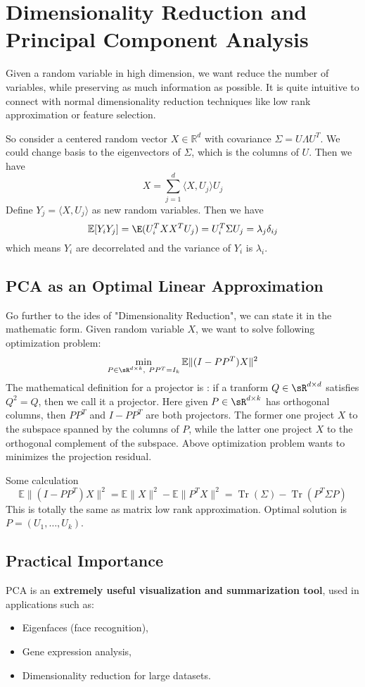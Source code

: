 \documentclass{article}
\begin{document}
\section{Dimensionality Reduction and Principal Component Analysis}
Given a random variable in high dimension, we want reduce the number of variables, while preserving as much information as possible. It is quite intuitive to connect with normal dimensionality reduction techniques like low rank approximation or feature selection.

So consider a centered random vector \( X \in \mathbb{R}^d \) with covariance \( \Sigma =U \Lambda U^T \). We could change basis to the eigenvectors of \( \Sigma \), which is the columns of \( U \). Then we have
\[
X=\sum_{j=1}^{d} \langle X, U_j \rangle U_j
\] 
Define $Y_j=\langle X, U_j \rangle$ as new random variables. Then we have
\[
\mathbb{E}[Y_i Y_j]=\E(U_i^T X X^T U_j)=U_i^T \Sigma U_j=\lambda_j \delta_{ij}
\]
which means \( Y_i \) are decorrelated and the variance of \( Y_i \) is \( \lambda_i \).



\subsection{PCA as an Optimal Linear Approximation}
Go further to the ides of "Dimensionality Reduction", we can state it in the mathematic form. Given random variable $X$, we want to solve following optimization problem:
\[
\min_{P\in \sR^{d\times k},\ PP^T=I_k } \mathbb{E} \| (I- P P^T) X \|^2
\]
The mathematical definition for a projector is : if a tranform $Q\in \sR^{d\times d}$ satisfies $Q^2=Q$, then we call it a projector. Here given $P\in \sR^{d\times k}$ has orthogonal columns, then $PP^T$ and $I-PP^T$ are both projectors. The former one project $X$ to the subspace spanned by the columns of $P$, while the latter one project $X$ to the orthogonal complement of the subspace. Above optimization problem wants to minimizes the projection residual.


Some calculation
\[
\mathbb{E} \| (I - P P^T) X \|^2 = \mathbb{E} \| X \|^2 - \mathbb{E} \| P^T X \|^2 = \operatorname{Tr}(\Sigma)  - \operatorname{Tr} (P^T \Sigma P)
\]
This is totally the same as matrix low rank approximation. Optimal solution is  $P=(U_1, \dots, U_k)$.


\subsection{Practical Importance}
PCA is an \textbf{extremely useful visualization and summarization tool}, used in applications such as:
\begin{itemize}
    \item Eigenfaces (face recognition),
    \item Gene expression analysis,
    \item Dimensionality reduction for large datasets.
\end{itemize}
\end{document}

